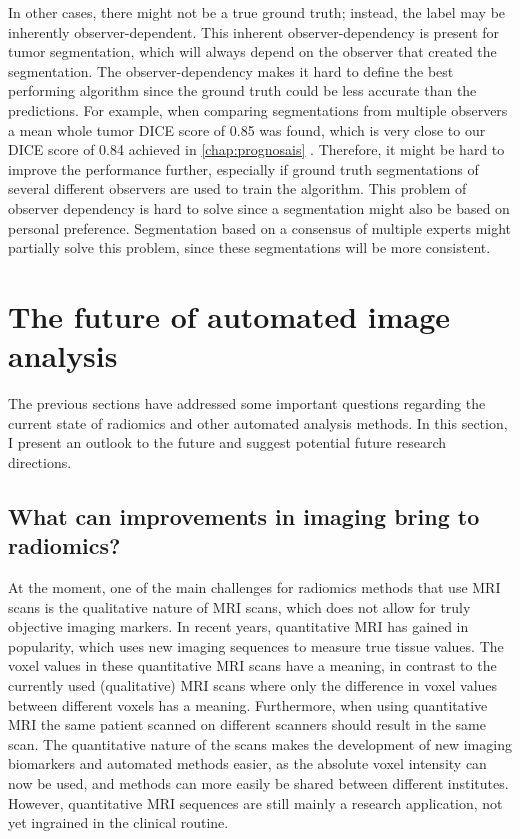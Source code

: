 In other cases, there might not be a true ground truth; instead, the label may be inherently observer-dependent.
This inherent observer-dependency is present for \gls{tumor} segmentation, which will always depend on the observer that created the segmentation.
The observer-dependency makes it hard to define the best performing algorithm since the ground truth could be less accurate than the predictions.
For example, when comparing segmentations from multiple observers a mean whole \gls{tumor} DICE score of 0.85 was found, which is very close to our DICE score of 0.84 achieved in \cref{chap:prognosais} \autocite{menze2015brats}.
Therefore, it might be hard to improve the performance further, especially if ground truth segmentations of several different observers are used to train the algorithm.
This problem of observer dependency is hard to solve since a segmentation might also be based on personal preference.
Segmentation based on a consensus of multiple experts might partially solve this problem, since these segmentations will be more consistent.

\section{The future of automated image analysis}\label{sec:discussion_future}

The previous sections have addressed some important questions regarding the current state of radiomics and other automated analysis methods.
In this section, I present an outlook to the future and suggest potential future research directions.


\subsection{What can improvements in imaging bring to radiomics?}\label{sec:dicussion_new_imaging}

At the moment, one of the main challenges for radiomics methods that use \gls{MRI} scans is the qualitative nature of \gls{MRI} scans, which does not allow for truly objective imaging markers.
In recent years, quantitative \gls{MRI} has gained in popularity, which uses new imaging sequences to measure true tissue values.
The voxel values in these quantitative \gls{MRI} scans have a meaning, in contrast to the currently used (qualitative) \gls{MRI} scans where only the difference in voxel values between different voxels has a meaning.
Furthermore, when using quantitative \gls{MRI} the same patient scanned on different scanners should result in the same scan.
The quantitative nature of the scans makes the development of new imaging biomarkers and automated methods easier, as the absolute voxel intensity can now be used, and methods can more easily be shared between different institutes.
However, quantitative \gls{MRI} sequences are still mainly a research application, not yet ingrained in the clinical routine.

